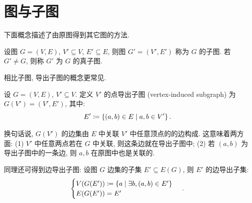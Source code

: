\documentclass[UTF8]{ctexart}
\theoremstyle{mystyle}
\theoremstyle{myremark}
\theoremstyle{plain}
\DeclarePairedDelimiter\set{\{}{\}}
\begin{document}
\section{图与子图}
下面概念描述了由原图得到其它图的方法.
\begin{definition}[\text{子图}]
    设图 $ G = (V, E) $, $ V' \subseteq V $, $ E' \subseteq E $, 则图 $ G' = (V', E') $ 称为 $ G $ 的子图. 若 $ G' \neq G $, 则称 $ G' $ 为 $ G $ 的真子图.
\end{definition}

相比子图, 导出子图的概念更常见.

\begin{definition}
    设 $ G = (V, E) $, $ V' \subseteq V $. 定义 $ V' $ 的点导出子图 (vertex-induced subgraph) 为 $ G(V') = (V', E') $, 其中:
    \[ E' \coloneqq \set{(a, b) \in E \mid a, b \in V'} \,.\]
\end{definition}

换句话说, $ G(V') $ 的边集由 $ E $ 中关联 $ V' $ 中任意顶点的的边构成. 这意味着两方面: (1) $ V' $ 中任意两点若在 $ G $ 中关联, 则这条边就在导出子图中; (2) 若 $ (a, b) $ 为导出子图中的一条边, 则 $ a, b $ 在原图中也是关联的.

同理还可得到边导出子图: 设图 $ G $ 边集的子集 $ E' \subseteq E(G) $, 则 $ E' $ 的边导出子集:
\[ \begin{cases}
    V(G(E')) \coloneqq \set{a \mid \exists b, (a, b) \in E'} \\
    E(G(E')) = E'
\end{cases} \,.\]

\end{document}
